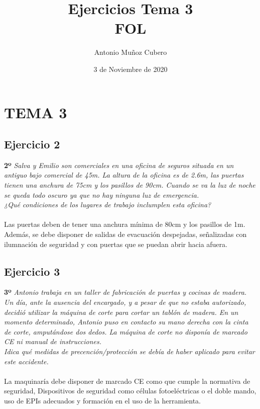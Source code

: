 \documentclass{article}
\title{Ejercicios Tema 3 \\ \textbf{FOL}}
\author{Antonio Muñoz Cubero}
\date{3 de Noviembre de 2020}
\begin{document}
  \maketitle
    \tableofcontents
        

  \newpage
    \section{TEMA 3}
      \subsection{Ejercicio 2}
        \textbf{2º} \textit{Salva y Emilio son comerciales en una oficina de seguros situada en un antiguo bajo comercial de 45m. 
        La altura de la oficina es de 2.6m, las puertas tienen una anchura de 75cm y los pasillos de 90cm. Cuando se va la luz de 
        noche se queda todo oscuro ya que no hay ninguna luz de emergencia. \\
        \textit{¿Qué condiciones de los lugares de trabajo inclumplen 
        esta oficina?}}
        \\\\
        Las puertas deben de tener una anchura mínima de 80cm y los pasillos de 1m. Además, se debe disponer de salidas de 
        evacuación despejadas, señalizadas con ilumnación de seguridad y con puertas que se puedan abrir hacia afuera.

        \subsection{Ejercicio 3}
        \textbf{3º} \textit{Antonio trabaja en un taller de fabricación de puertas y cocinas de madera. Un día, ante la ausencia 
        del encargado, y a pesar de que no estaba autorizado, decidió utilizar la máquina de corte para cortar un tablón de madera. 
        En un momento determinado, Antonio puso en contacto su mano derecha con la cinta de corte, amputándose dos dedos. La máquina 
        de corte no disponía de marcado CE ni manual de instrucciones.}\\
        \textit{Idica qué medidas de precención/protección se debía de haber aplicado para evitar este accidente.}
        \\\\
        La maquinaría debe disponer de marcado CE como que cumple la normativa de seguridad, Dispositivos de seguridad como células 
        fotoeléctricas o el doble mando, uso de EPIs adecuados y formación en el uso de la herramienta.
\end{document}
